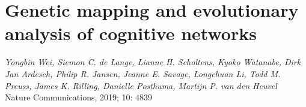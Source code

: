 \pagestyle{MyStyle}

\chapter{Genetic mapping and evolutionary analysis of cognitive networks}
\label{ch:HAR}


\begin{flushright}
\textit{Yongbin Wei, Siemon C. de Lange, Lianne H. Scholtens, Kyoko Watanabe, Dirk Jan Ardesch, Philip R. Jansen, Jeanne E. Savage, Longchuan Li, Todd M. Preuss, James K. Rilling, Danielle Posthuma, Martijn P. van den Heuvel}\\
Nature Communications, 2019; 10: 4839
\vspace{7 mm}

\end{flushright}

